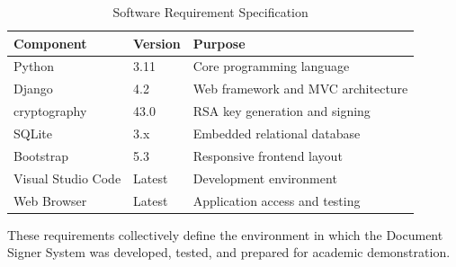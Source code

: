\begin{table}[H]
\centering
\caption{Software Requirement Specification}
\label{tab:srs}
\begin{tabular}{|l|l|p{7.5cm}|}
\hline
\textbf{Component} & \textbf{Version} & \textbf{Purpose} \\
\hline
Python & 3.11 & Core programming language \\
\hline
Django & 4.2 & Web framework and MVC architecture \\
\hline
cryptography & 43.0 & RSA key generation and signing \\
\hline
SQLite & 3.x & Embedded relational database \\
\hline
Bootstrap & 5.3 & Responsive frontend layout \\
\hline
Visual Studio Code & Latest & Development environment \\
\hline
Web Browser & Latest & Application access and testing \\
\hline
\end{tabular}
\end{table}

These requirements collectively define the environment in which the Document Signer System was developed, tested, and prepared for academic demonstration.
